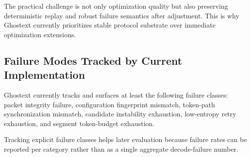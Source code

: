 The practical challenge is not only optimization quality but also preserving deterministic replay and robust failure semantics after adjustment. This is why Ghostext currently prioritizes stable protocol substrate over immediate optimization extensions.

\subsection{Failure Modes Tracked by Current Implementation}

Ghostext currently tracks and surfaces at least the following failure classes: packet integrity failure, configuration fingerprint mismatch, token-path synchronization mismatch, candidate instability exhaustion, low-entropy retry exhaustion, and segment token-budget exhaustion.

Tracking explicit failure classes helps later evaluation because failure rates can be reported per category rather than as a single aggregate decode-failure number.
